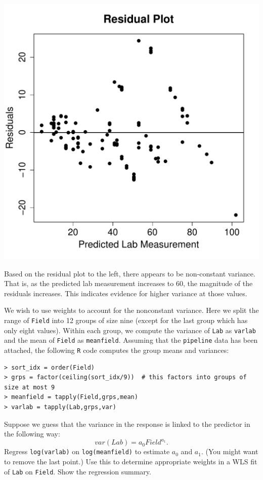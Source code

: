 \documentclass{homework}
\begin{document}
\begin{longproblem}
\begin{minipage}{.5\textwidth}
\includegraphics[width=\textwidth]{nist_resid.pdf}
\end{minipage}
\begin{minipage}{.5\textwidth}
Based on the residual plot to the left, there appears to be non-constant
variance.  That is, as the predicted lab measurement increases to 60, the
magnitude of the residuals increases. This indicates evidence for higher variance at those values.\end{minipage}

\begin{longsubproblem}We wish to use weights to account for the nonconstant variance. Here we split the range of \texttt{Field} into 12 groups of size nine (except for the last group which has only eight values).  Within each group, we compute the variance of \texttt{Lab} as \texttt{varlab} and the mean of \texttt{Field} as \texttt{meanfield}.  Assuming that the \texttt{pipeline} data has been attached, the following \texttt{R} code computes the group means and variances:
\begin{verbatim}
> sort_idx = order(Field) 
> grps = factor(ceiling(sort_idx/9))  # this factors into groups of size at most 9
> meanfield = tapply(Field,grps,mean)
> varlab = tapply(Lab,grps,var)
\end{verbatim}
Suppose we guess that the variance in the response is linked to the predictor in the following way:
$$
  var(Lab) = a_0Field^{a_1}.
$$
Regress \texttt{log(varlab)} on \texttt{log(meanfield)} to estimate $a_0$ and $a_1$.  (You might want to remove the last point.) Use this to determine appropriate weights in a WLS fit of \texttt{Lab} on \texttt{Field}.  Show the regression summary.
\end{longsubproblem}


\end{longproblem}
\end{document}
